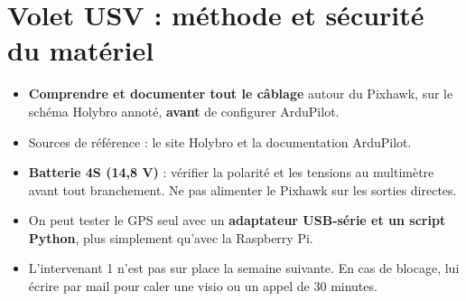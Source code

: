 \documentclass[10pt,a4paper]{article}
\begin{document}
\section{Volet USV : méthode et sécurité du matériel}
\begin{itemize}
  \item \textbf{Comprendre et documenter tout le câblage} autour du Pixhawk, sur le schéma Holybro annoté, \textbf{avant} de configurer ArduPilot.
  \item Sources de référence : le site Holybro et la documentation ArduPilot.
  \item \textbf{Batterie 4S (14,8 V)} : vérifier la polarité et les tensions au multimètre avant tout branchement. Ne pas alimenter le Pixhawk sur les sorties directes.
  \item On peut tester le GPS seul avec un \textbf{adaptateur USB-série et un script Python}, plus simplement qu'avec la Raspberry Pi.
  \item L'intervenant 1 n'est pas sur place la semaine suivante. En cas de blocage, lui écrire par mail pour caler une visio ou un appel de 30 minutes.
\end{itemize}
\end{document}
